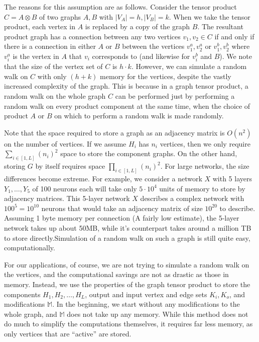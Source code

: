 \documentclass{article}
\newcommand{\listvec}[2]{#1_1, #1_2, \ldots, #1_{#2}}
\newcommand{\M}{\mathbb{M}}
\begin{document}
The reasons for this assumption are as follows. Consider the tensor product $ C = A \otimes B$ of two graphs $A,B$ with $|V_A| = h, |V_B| = k$. When we take the tensor product, each vertex in $A$ is replaced by a copy of the graph $B$. The resultant product graph has a connection between any two vertices $v_1, v_2 \in C$ if and only if there is a connection in either $A$ or $B$ between the vertices $v_1^a, v_2^a$ or $v_1^b, v_2^b$ where $v_i^a$ is the vertex in $A$ that $v_i$ corresponds to (and likewise for $v_i^b$ and $B$). We note that the size of the vertex set of $C$ is $h \cdot k$. However, we can simulate a random walk on $C$ with only $(h + k)$ memory for the vertices, despite the vastly increased complexity of the graph.  This is because in a graph tensor product, a random walk on the whole graph $C$ can be performed just by performing a random walk on every product component at the same time, when the choice of product $A$ or $B$ on which to perform a random walk is made randomly.

Note that the space required to store a graph as an adjacency matrix is $O(n^2)$ on the number of vertices. If we assume $H_i$ has $n_i$ vertices, then we only require $ \sum_{i \in [1,L]} (n_i)^2 $ space to store the component graphs. On the other hand, storing $G$ by itself requires space $ \prod_{i \in [1,L]} (n_i)^2 $. For large networks, the size differences become extreme. For example, we consider a network $X$ with 5 layers $Y_1, \ldots, Y_5$ of 100 neurons each will take only $5 \cdot 10^4$ units of memory to store by adjacency matrices. This 5-layer network $X$ describes a complex network with $100^{5}=10^{10}$ neurons that would take an adjacency matrix of size $10^{20}$ to describe. Assuming 1 byte memory per connection (A fairly low estimate), the 5-layer network takes up about 50MB, while it's counterpart takes around a million TB to store directly.Simulation of a random walk on such a graph is still quite easy, computationally.

For our applications, of course, we are not trying to simulate a random walk on the vertices, and the computational savings are not as drastic as those in memory. Instead, we use the properties of the graph tensor product to store the components $\listvec{H}{L}$, output and input vertex and edge sets $K_i, K_o$, and modifications $\M$. In the beginning, we start without any modifications to the whole graph, and $\M$ does not take up any memory. While this method does not do much to simplify the computations themselves, it requires far less memory, as only vertices that are ``active'' are stored. 
\end{document}
